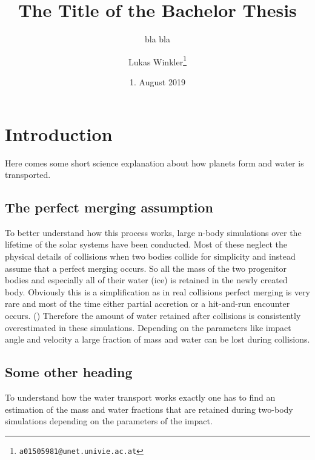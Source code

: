 
\title{The Title of the Bachelor Thesis}
\subtitle{bla bla}
\author{Lukas Winkler\footnote{\texttt{a01505981@unet.univie.ac.at}}}
\date{1. August 2019}

\usepackage{lipsum}  %
\newcommand{\blabla}{Bla bla bla}


	
\maketitle

\tableofcontents

\chapter{Introduction}\label{introduction}


Here comes some short science explanation about how planets form and water is transported.
\lipsum[1]

\section{The perfect merging assumption}

To better understand how this process works, large n-body simulations over the lifetime of the solar systems have been conducted. Most of these neglect the physical details of collisions when two bodies collide for simplicity and instead assume that a perfect merging occurs. So all the mass of the two progenitor bodies and especially all of their water (ice) is retained in the newly created body. Obviously this is a simplification as in real collisions perfect merging is very rare and most of the time either partial accretion or a hit-and-run encounter occurs. (\cite{CollisionTypes}) Therefore the amount of water retained after collisions is consistently overestimated in these simulations. Depending on the parameters like impact angle and velocity a large fraction of mass and water can be lost during collisions.

\section{Some other heading}

To understand how the water transport works exactly one has to find an estimation of the mass and water fractions that are retained during two-body simulations depending on the parameters of the impact.

